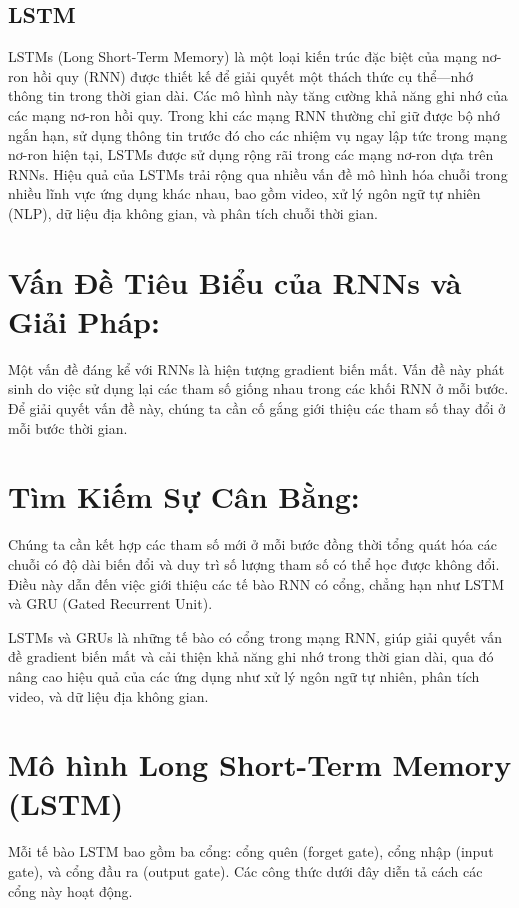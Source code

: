 \documentclass[conference]{IEEEtran}
\begin{document}
\subsection{LSTM}
LSTMs (Long Short-Term Memory) là một loại kiến trúc đặc biệt của mạng nơ-ron hồi quy (RNN) được thiết kế để giải quyết một thách thức cụ thể—nhớ thông tin trong thời gian dài. Các mô hình này tăng cường khả năng ghi nhớ của các mạng nơ-ron hồi quy. Trong khi các mạng RNN thường chỉ giữ được bộ nhớ ngắn hạn, sử dụng thông tin trước đó cho các nhiệm vụ ngay lập tức trong mạng nơ-ron hiện tại, LSTMs được sử dụng rộng rãi trong các mạng nơ-ron dựa trên RNNs. Hiệu quả của LSTMs trải rộng qua nhiều vấn đề mô hình hóa chuỗi trong nhiều lĩnh vực ứng dụng khác nhau, bao gồm video, xử lý ngôn ngữ tự nhiên (NLP), dữ liệu địa không gian, và phân tích chuỗi thời gian.
\section*{Vấn Đề Tiêu Biểu của RNNs và Giải Pháp:}
Một vấn đề đáng kể với RNNs là hiện tượng gradient biến mất. Vấn đề này phát sinh do việc sử dụng lại các tham số giống nhau trong các khối RNN ở mỗi bước. Để giải quyết vấn đề này, chúng ta cần cố gắng giới thiệu các tham số thay đổi ở mỗi bước thời gian.
\section*{Tìm Kiếm Sự Cân Bằng:}
Chúng ta cần kết hợp các tham số mới ở mỗi bước đồng thời tổng quát hóa các chuỗi có độ dài biến đổi và duy trì số lượng tham số có thể học được không đổi. Điều này dẫn đến việc giới thiệu các tế bào RNN có cổng, chẳng hạn như LSTM và GRU (Gated Recurrent Unit).

LSTMs và GRUs là những tế bào có cổng trong mạng RNN, giúp giải quyết vấn đề gradient biến mất và cải thiện khả năng ghi nhớ trong thời gian dài, qua đó nâng cao hiệu quả của các ứng dụng như xử lý ngôn ngữ tự nhiên, phân tích video, và dữ liệu địa không gian.
\section*{Mô hình Long Short-Term Memory (LSTM)}

Mỗi tế bào LSTM bao gồm ba cổng: cổng quên (forget gate), cổng nhập (input gate), và cổng đầu ra (output gate). Các công thức dưới đây diễn tả cách các cổng này hoạt động.
\end{document}
